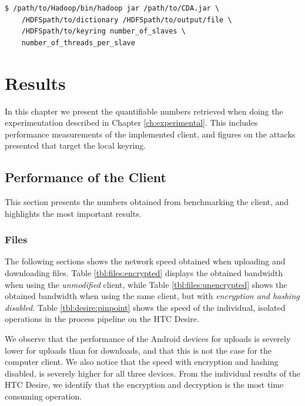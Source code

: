 \documentclass[pdftex,english,10pt,b5paper,twoside]{book}
\begin{document}
\lstset{language=bash, label=lst:CDA, caption=Executing the CDA Attack}
\begin{lstlisting}
$ /path/to/Hadoop/bin/hadoop jar /path/to/CDA.jar \
    /HDFSpath/to/dictionary /HDFSpath/to/output/file \
    /HDFSpath/to/keyring number_of_slaves \
    number_of_threads_per_slave
\end{lstlisting}

\chapter{Results}
\label{ch:results}

In this chapter we present the quantifiable numbers retrieved when doing the
experimentation described in Chapter \ref{ch:experimental}. This includes
performance measurements of the implemented client, and figures on the attacks
presented that target the local keyring.

\section{Performance of the Client}

This section presents the numbers obtained from benchmarking the client, and
highlights the most important results.

\subsection{Files}

The following sections shows the network speed obtained when uploading and
downloading files. Table \ref{tbl:files:encrypted} displays the obtained
bandwidth when using the \emph{unmodified} client, while Table
\ref{tbl:files:unencrypted} shows the obtained bandwidth when using the same
client, but with \emph{encryption and hashing disabled}. Table
\ref{tbl:desire:pinpoint} shows the speed of the individual, isolated
operations in the process pipeline on the HTC Desire.





We observe that the performance of the Android devices for uploads is severely
lower for uploads than for downloads, and that this is not the case for the
computer client. We also notice that the speed with encryption and hashing
disabled, is severely higher for all three devices. From the individual results
of the HTC Desire, we identify that the encryption and decryption is the most
time consuming operation.
\end{document}
